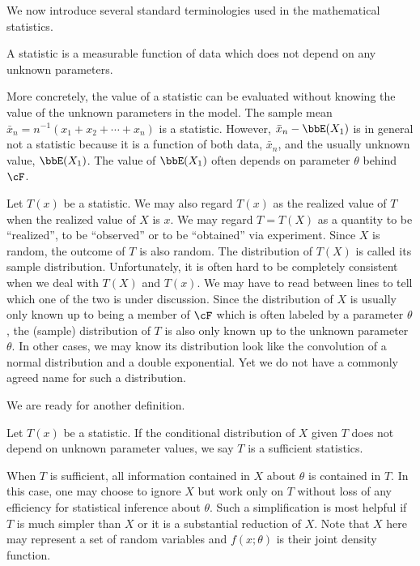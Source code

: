 We now introduce several standard terminologies used in the mathematical
statistics. 

\begin{defi}
A statistic is a measurable function of data which does not depend on any unknown
parameters.
\end{defi}

More concretely, the value of a statistic can be evaluated without
knowing the value of the unknown parameters in the model.
The sample mean $\bar x_n = n^{-1} (x_1 + x_2 + \cdots + x_n)$ is a statistic.
However, $\bar x_n - \bbE(X_1)$ is in general not a statistic because it is a function
of both data, $\bar x_n$, and the usually unknown value, $\bbE(X_1)$.
The value of $\bbE(X_1)$ often depends
on parameter $\theta$ behind $\cF$. 

Let $T(x)$ be a statistic. We may also regard $T(x)$ as the realized value
of $T$ when the realized value of $X$ is $x$. We may regard
$T = T(X)$ as a quantity to be ``realized'', to be ``observed''
or to be ``obtained'' via experiment. 
Since $X$ is random, the outcome of $T$ is also random.
The distribution of $T(X)$ is called its sample distribution. 
Unfortunately, it is often
hard to be completely consistent when we deal with $T(X)$ and $T(x)$.
We may have to read between lines to tell which one of the
two is under discussion. Since the distribution of $X$ is usually only known
up to being a member of $\cF$ which is often labeled by a parameter $\theta$,
the (sample) distribution of $T$ is also only known up to the 
unknown parameter $\theta$. In other cases, we may know its distribution
look like the convolution of a normal distribution and a double exponential.
Yet we do not have a commonly agreed name for such a distribution. 

We are ready for another definition.

\begin{defi}
Let $T(x)$ be a statistic. If the conditional distribution of $X$ given $T$
does not depend on unknown parameter values, we say $T$ is a sufficient
statistics.
\end{defi}

When $T$ is sufficient, all information contained in $X$ about $\theta$ is 
contained in $T$.  In this case, one may choose
to ignore $X$ but work only on $T$ without loss of any efficiency
for statistical inference about $\theta$.
Such a simplification is most helpful if $T$ is much simpler than $X$ or it is a
substantial reduction of $X$.
Note that $X$ here may represent a set of random variables
and $f(x; \theta)$ is their joint density function.

